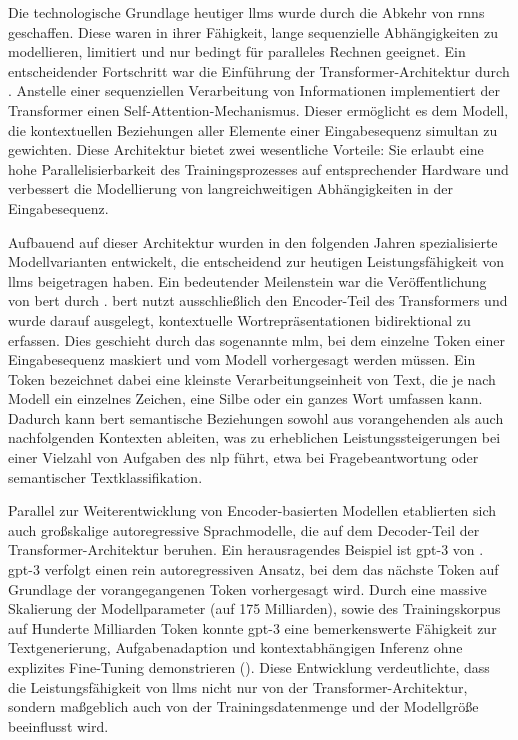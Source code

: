 Die technologische Grundlage heutiger \glspl{llm} wurde durch die Abkehr von \glspl{rnn} geschaffen.
Diese waren in ihrer Fähigkeit, lange sequenzielle Abhängigkeiten zu modellieren, limitiert und nur bedingt für paralleles Rechnen geeignet\autocite{vaswani_attention_2023}.
Ein entscheidender Fortschritt war die Einführung der Transformer-Architektur durch \citeauthor{vaswani_attention_2023}.
Anstelle einer sequenziellen Verarbeitung von Informationen implementiert der Transformer einen Self-Attention-Mechanismus.
Dieser ermöglicht es dem Modell, die kontextuellen Beziehungen aller Elemente einer Eingabesequenz simultan zu gewichten.
Diese Architektur bietet zwei wesentliche Vorteile: Sie erlaubt eine hohe Parallelisierbarkeit des Trainingsprozesses auf entsprechender Hardware und verbessert die Modellierung von langreichweitigen Abhängigkeiten in der Eingabesequenz\autocite{vaswani_attention_2023}.

Aufbauend auf dieser Architektur wurden in den folgenden Jahren spezialisierte Modellvarianten entwickelt, die entscheidend zur heutigen Leistungsfähigkeit von \glspl{llm} beigetragen haben.
Ein bedeutender Meilenstein war die Veröffentlichung von \gls{bert} durch \citeauthor{devlin_bert_2019}\autocite{devlin_bert_2019}.
\gls{bert} nutzt ausschließlich den Encoder-Teil des Transformers und wurde darauf ausgelegt, kontextuelle Wortrepräsentationen bidirektional zu erfassen.
Dies geschieht durch das sogenannte \gls{mlm}, bei dem einzelne Token einer Eingabesequenz maskiert und vom Modell vorhergesagt werden müssen.
Ein Token bezeichnet dabei eine kleinste Verarbeitungseinheit von Text, die je nach Modell ein einzelnes Zeichen, eine Silbe oder ein ganzes Wort umfassen kann.
Dadurch kann \gls{bert} semantische Beziehungen sowohl aus vorangehenden als auch nachfolgenden Kontexten ableiten, was zu erheblichen Leistungssteigerungen bei einer Vielzahl von Aufgaben des \gls{nlp} führt, etwa bei Fragebeantwortung oder semantischer Textklassifikation\autocite{devlin_bert_2019}.

Parallel zur Weiterentwicklung von Encoder-basierten Modellen etablierten sich auch großskalige autoregressive Sprachmodelle, die auf dem Decoder-Teil der Transformer-Architektur beruhen.
Ein herausragendes Beispiel ist \gls{gpt}-3 von \citeauthor{brown_language_2020}\autocite{brown_language_2020}.
\gls{gpt}-3 verfolgt einen rein autoregressiven Ansatz, bei dem das nächste Token auf Grundlage der vorangegangenen Token vorhergesagt wird.
Durch eine massive Skalierung der Modellparameter (auf 175 Milliarden), sowie des Trainingskorpus auf Hunderte Milliarden Token konnte \gls{gpt}-3 eine bemerkenswerte Fähigkeit zur Textgenerierung, Aufgabenadaption und kontextabhängigen Inferenz ohne explizites Fine-Tuning demonstrieren ().
Diese Entwicklung verdeutlichte, dass die Leistungsfähigkeit von \glspl{llm} nicht nur von der Transformer-Architektur, sondern maßgeblich auch von der Trainingsdatenmenge und der Modellgröße beeinflusst wird.

